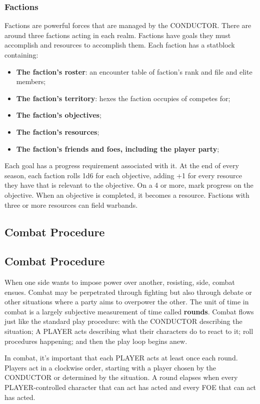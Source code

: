 \subsubsection{Factions}
Factions are powerful forces that are managed by the CONDUCTOR. There are around three factions acting in each realm. Factions have goals they must accomplish and resources to accomplish them. Each faction has a statblock containing:
\begin{itemize}
    \item {\textbf{The faction's roster}: an encounter table of faction's rank and file and elite members;}
    \item {\textbf{The faction's territory}: hexes the faction occupies of competes for;}
    \item {\textbf{The faction's objectives};}
    \item {\textbf{The faction's resources};}
    \item {\textbf{The faction's friends and foes, including the player party};}
\end{itemize}
Each goal has a progress requirement associated with it. At the end of every season, each faction rolls 1d6 for each objective, adding +1 for every resource they have that is relevant to the objective. On a 4 or more, mark progress on the objective. When an objective is completed, it becomes a resource. Factions with three or more resources can field warbands.

\subsection{Combat Procedure}
\subsection{Combat Procedure}
When one side wants to impose power over another, resisting, side, combat ensues. Combat may be perpetrated through fighting but also through debate or other situations where a party aims to overpower the other. The unit of time in combat is a largely subjective measurement of time called \textbf{rounds}. Combat flows just like the standard play procedure: with the CONDUCTOR describing the situation; A PLAYER acts describing what their characters do to react to it; roll procedures happening; and then the play loop begins anew.

In combat, it's important that each PLAYER acts at least once each round. Players act in a clockwise order, starting with a player chosen by the CONDUCTOR or determined by the situation. A round elapses when every PLAYER-controlled character that can act has acted and every FOE that can act has acted.

